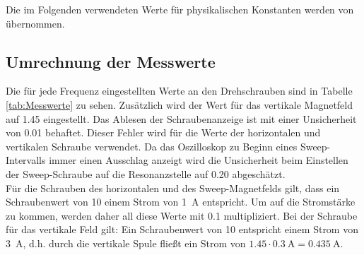 Die im Folgenden verwendeten Werte für physikalischen Konstanten werden von \cite{Codata} übernommen.
\subsection{Umrechnung der Messwerte}
Die für jede Frequenz eingestellten Werte an den Drehschrauben sind in Tabelle \ref{tab:Messwerte} zu sehen. Zusätzlich wird der Wert für das vertikale Magnetfeld auf 1.45 eingestellt.
Das Ablesen der Schraubenanzeige ist mit einer Unsicherheit von 0.01 behaftet. Dieser Fehler wird für die Werte der horizontalen und vertikalen Schraube verwendet. Da das Oszilloskop zu Beginn eines Sweep-Intervalls immer einen Ausschlag anzeigt wird die Unsicherheit beim Einstellen der Sweep-Schraube auf die Resonanzstelle auf 0.20 abgeschätzt. \\
Für die Schrauben des horizontalen und des Sweep-Magnetfelds gilt, dass ein Schraubenwert von 10 einem Strom von \SI{1}{\ampere} entspricht. Um auf die Stromstärke zu kommen, werden daher all diese Werte mit 0.1 multipliziert. Bei der Schraube für das vertikale Feld gilt: Ein Schraubenwert von 10 entspricht einem Strom von \SI{3}{\ampere}, d.h. durch die vertikale Spule fließt ein Strom von $1.45\cdot \SI{0.3}{\ampere} = \SI{0.435}{\ampere}$.

\clearpage
